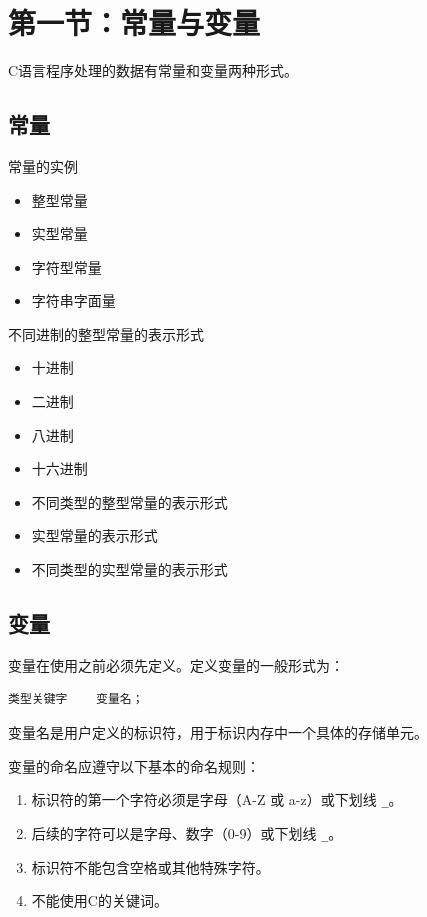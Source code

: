 \documentclass{article}
\begin{document}
\section{第一节：常量与变量}
C语言程序处理的数据有常量和变量两种形式。

\subsection{常量}
常量的实例
\begin{itemize}
    \item 整型常量
    \item 实型常量
    \item 字符型常量
    \item 字符串字面量
\end{itemize}

不同进制的整型常量的表示形式
\begin{itemize}
    \item 十进制
    \item 二进制
    \item 八进制
    \item 十六进制
\end{itemize}

\begin{itemize}
    \item 不同类型的整型常量的表示形式
    \item 实型常量的表示形式
    \item 不同类型的实型常量的表示形式
\end{itemize}

\subsection{变量}
变量在使用之前必须先定义。定义变量的一般形式为：
\begin{verbatim}
类型关键字    变量名；
\end{verbatim}

变量名是用户定义的标识符，用于标识内存中一个具体的存储单元。

变量的命名应遵守以下基本的命名规则：
\begin{enumerate}
    \item 标识符的第一个字符必须是字母（A-Z 或 a-z）或下划线 \texttt{\_}。
    \item 后续的字符可以是字母、数字（0-9）或下划线 \texttt{\_}。
    \item 标识符不能包含空格或其他特殊字符。
    \item 不能使用C的关键词。
\end{enumerate}
\end{document}
